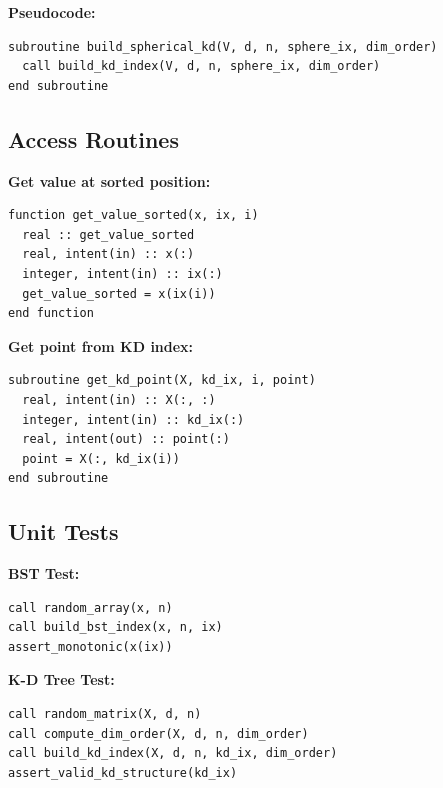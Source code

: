 \documentclass{article}
\begin{document}
\textbf{Pseudocode:}
\begin{verbatim}
subroutine build_spherical_kd(V, d, n, sphere_ix, dim_order)
  call build_kd_index(V, d, n, sphere_ix, dim_order)
end subroutine
\end{verbatim}

\subsection{Access Routines}

\textbf{Get value at sorted position:}
\begin{verbatim}
function get_value_sorted(x, ix, i)
  real :: get_value_sorted
  real, intent(in) :: x(:)
  integer, intent(in) :: ix(:)
  get_value_sorted = x(ix(i))
end function
\end{verbatim}

\textbf{Get point from KD index:}
\begin{verbatim}
subroutine get_kd_point(X, kd_ix, i, point)
  real, intent(in) :: X(:, :)
  integer, intent(in) :: kd_ix(:)
  real, intent(out) :: point(:)
  point = X(:, kd_ix(i))
end subroutine
\end{verbatim}

\subsection{Unit Tests}

\textbf{BST Test:}
\begin{verbatim}
call random_array(x, n)
call build_bst_index(x, n, ix)
assert_monotonic(x(ix))
\end{verbatim}

\textbf{K-D Tree Test:}
\begin{verbatim}
call random_matrix(X, d, n)
call compute_dim_order(X, d, n, dim_order)
call build_kd_index(X, d, n, kd_ix, dim_order)
assert_valid_kd_structure(kd_ix)
\end{verbatim}
\end{document}
